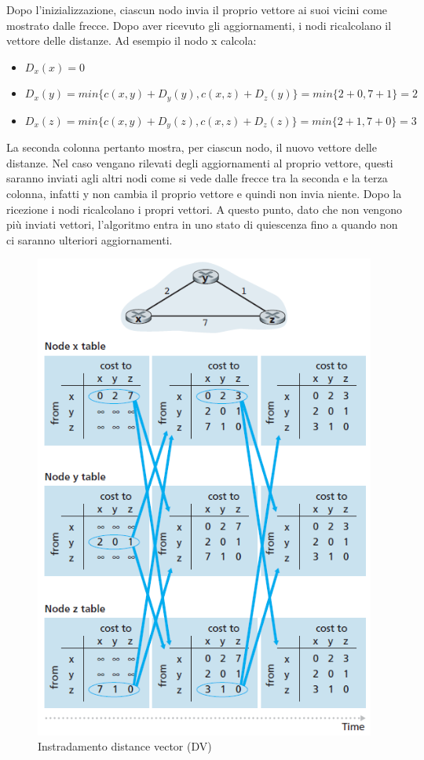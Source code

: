 \documentclass[11pt,a4paper]{book}
\begin{document}
Dopo l'inizializzazione, ciascun nodo invia il proprio vettore ai suoi vicini come mostrato dalle frecce. Dopo aver ricevuto gli aggiornamenti, i nodi ricalcolano il vettore delle distanze. Ad esempio il nodo x calcola:
\begin{itemize}
	\item $D_{x}(x) = 0$
	\item $D_{x}(y) = min\{c(x, y) + D_{y}(y), c(x, z) + D_{z}(y)\} = min\{2 + 0, 7 + 1\} = 2$
	\item $D_{x}(z) = min\{c(x, y) + D_{y}(z), c(x, z) + D_{z}(z)\} = min\{2 + 1, 7 + 0\} = 3$
\end{itemize}
La seconda colonna pertanto mostra, per ciascun nodo, il nuovo vettore delle distanze. Nel caso vengano rilevati degli aggiornamenti al proprio vettore, questi saranno inviati agli altri nodi come si vede dalle frecce tra la seconda e la terza colonna, infatti y non cambia il proprio vettore e quindi non invia niente. Dopo la ricezione i nodi ricalcolano i propri vettori. A questo punto, dato che non vengono più inviati vettori, l'algoritmo entra in uno stato di quiescenza fino a quando non ci saranno ulteriori aggiornamenti.
\begin{figure}
	\begin{center}
		\includegraphics[scale=1]{img/064.png}
		\caption{Instradamento distance vector (DV)}
		\label{fig: 064}
	\end{center}
\end{figure}
\end{document}
